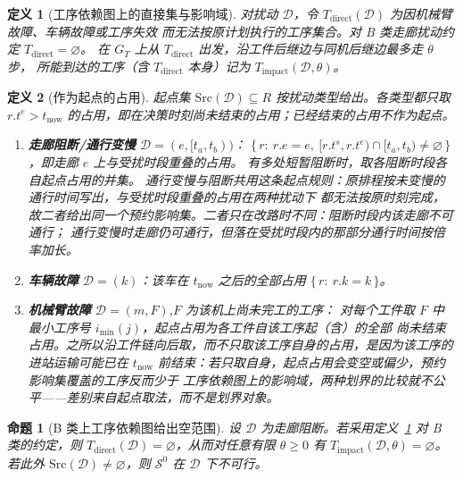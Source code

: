 \documentclass[manuscript,screen,review]{acmart}
\newtheorem{definition}{定义}
\newtheorem{prop}{命题}
\begin{document}
\begin{definition}[工序依赖图上的直接集与影响域]
\label{def:task_impact}
对扰动 \(\mathcal{D}\)，令 \(T_{\mathrm{direct}}(\mathcal{D})\) 为因机械臂故障、车辆故障或工序失效
而无法按原计划执行的工序集合。对 B 类走廊扰动约定 \(T_{\mathrm{direct}}=\varnothing\)。
在 \(G_T\) 上从 \(T_{\mathrm{direct}}\) 出发，沿工件后继边与同机后继边最多走 \(\theta\) 步，
所能到达的工序（含 \(T_{\mathrm{direct}}\) 本身）记为 \(T_{\mathrm{impact}}(\mathcal{D},\theta)\)。
\end{definition}

\begin{definition}[作为起点的占用]
\label{def:seeds}
起点集 \(\mathrm{Src}(\mathcal{D})\subseteq R\) 按扰动类型给出。各类型都只取
\(r.t^e>t_{\mathrm{now}}\) 的占用，即在决策时刻尚未结束的占用；已经结束的占用不作为起点。
\begin{enumerate}[label=(\alph*),leftmargin=1.6em,itemsep=0.15em]
\item \textbf{走廊阻断/通行变慢} \(\mathcal{D}=(e,[t_a,t_b))\)：
\(\{\,r:\ r.e=e,\ [r.t^s,r.t^e)\cap[t_a,t_b)\neq\varnothing\,\}\)，即走廊 \(e\) 上与受扰时段重叠的占用。
有多处短暂阻断时，取各阻断时段各自起点占用的并集。
通行变慢与阻断共用这条起点规则：原排程按未变慢的通行时间写出，与受扰时段重叠的占用在两种扰动下
都无法按原时刻完成，故二者给出同一个预约影响集。二者只在改路时不同：阻断时段内该走廊不可通行；
通行变慢时走廊仍可通行，但落在受扰时段内的那部分通行时间按倍率加长。
\item \textbf{车辆故障} \(\mathcal{D}=(k)\)：该车在 \(t_{\mathrm{now}}\) 之后的全部占用
\(\{\,r:\ r.k=k\,\}\)。
\item \textbf{机械臂故障} \(\mathcal{D}=(m,F)\),\(F\) 为该机上尚未完工的工序：
对每个工件取 \(F\) 中最小工序号 \(i_{\min}(j)\)，起点占用为各工件自该工序起（含）的全部
尚未结束占用。之所以沿工件链向后取，而不只取该工序自身的占用，是因为该工序的进站运输可能已在
\(t_{\mathrm{now}}\) 前结束：若只取自身，起点占用会变空或偏少，预约影响集覆盖的工序反而少于
工序依赖图上的影响域，两种划界的比较就不公平——差别来自起点取法，而不是划界对象。
\end{enumerate}
\end{definition}

\begin{prop}[B 类上工序依赖图给出空范围]
\label{prop:miss}
设 \(\mathcal{D}\) 为走廊阻断。若采用定义~\ref{def:task_impact} 对 B 类的约定，则
\(T_{\mathrm{direct}}(\mathcal{D})=\varnothing\)，从而对任意有限 \(\theta\ge 0\) 有
\(T_{\mathrm{impact}}(\mathcal{D},\theta)=\varnothing\)。
若此外 \(\mathrm{Src}(\mathcal{D})\neq\varnothing\)，则 \(\mathcal{S}^0\) 在 \(\mathcal{D}\) 下不可行。
\end{prop}
\end{document}
